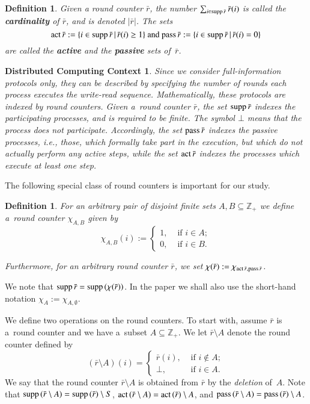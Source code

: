 \documentclass{amsart}[10pt]
\newtheorem{df}[theorem]{Definition}
\newtheorem{dcc}[theorem]{Distributed Computing Context}
\newcommand{\act}{\text{\rm act}\,}
\newcommand{\es}{\emptyset}
\newcommand{\pass}{\text{\rm pass}\,}
\newcommand{\pnt}{round counter }
\newcommand{\sm}{\setminus}
\newcommand{\supp}{\text{\rm supp}\,}
\newcommand{\tr}{{\bar r}}
\newcommand{\zz}{{\mathbb Z}}
\numberwithin{equation}{section}
\numberwithin{figure}{section}
\numberwithin{table}{section}
\begin{document}
\begin{df}
Given a round counter $\tr$, the number $\sum_{i\in\supp\tr}\tr(i)$ is
called the {\bf cardinality} of $\tr$, and is denoted $|\tr|$. The
sets
\[\act\tr:=\{i\in\supp\tr\,|\,\tr(i)\geq 1\}
\text{ and } \pass\tr:=\{i\in\supp\tr\,|\,\tr(i)=0\}\] 
are called the {\bf active} and the {\bf passive} sets of~$\tr$.
\end{df}

\begin{dcc}
Since we consider full-information protocols only, they can be
described by specifying the number of rounds each process executes the
write-read sequence. Mathematically, these protocols are indexed by
round counters. Given a~round counter $\tr$, the set $\supp\tr$
indexes the participating processes, and is required to be finite. The
symbol $\bot$ means that the process does not participate.
Accordingly, the set $\pass\tr$ indexes the passive processes, i.e.,
those, which formally take part in the execution, but which do not
actually perform any active steps, while the set $\act\tr$ indexes the
processes which execute at least one step.
\end{dcc}

The following special class of round counters is important for our
study.

\begin{df}
For an arbitrary pair of disjoint finite sets $A,B\subseteq\zz_+$
we define a~round counter $\chi_{A,B}$ given by
\[\chi_{A,B}(i):=\begin{cases}
1, & \text{ if } i\in A;\\
0, & \text{ if } i\in B.
\end{cases}\]

Furthermore, for an arbitrary round counter $\tr$, we set
$\chi(\tr):=\chi_{\act\tr,\pass\tr}$.
\end{df}

We note that $\supp\tr=\supp(\chi(\tr))$. In the paper we shall also
use the short-hand notation $\chi_A:=\chi_{A,\es}$.

We define two operations on the round counters. To start with, assume
$\tr$ is a~\pnt and we have a~subset $A\subseteq\zz_+$. We let
$\tr\sm A$ denote the \pnt defined by
\[(\tr\sm A)(i)=\begin{cases}
\tr(i), & \text{ if } i\notin A;\\
\bot,   & \text{ if } i\in A.
\end{cases}\]
We say that the \pnt $\tr\sm A$ is obtained from $\tr$ by the {\it
  deletion} of~$A$. Note that $\supp(\tr\sm A)=\supp(\tr)\setminus S$,
$\act(\tr\sm A)=\act(\tr)\setminus A$, and $\pass(\tr\sm
A)=\pass(\tr)\setminus A$. 
\end{document}
